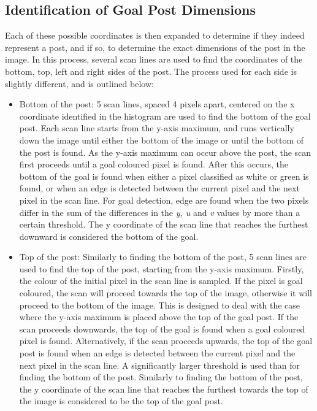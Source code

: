 \documentclass[pdftex,11pt,a4paper]{report}
\begin{document}
\subsection{Identification of Goal Post Dimensions}

Each of these possible coordinates is then expanded to determine if they indeed represent a post, and if so, to determine the exact dimensions of the post in the image. In this process, several scan lines are used to find the coordinates of the bottom, top, left and right sides of the post. The process used for each side is slightly different, and is outlined below:\begin{itemize}
\item{Bottom of the post: 5 scan lines, spaced 4 pixels apart, centered on the x coordinate identified in the histogram are used to find the bottom of the goal post. Each scan line starts from the y-axis maximum, and runs vertically down the image until either the bottom of the image or until the bottom of the post is found. As the y-axis maximum can occur above the post, the scan first proceeds until a goal coloured pixel is found. After this occurs, the bottom of the goal is found when either a pixel classified as white or green is found, or when an edge is detected between the current pixel and the next pixel in the scan line. For goal detection, edge are found when the two pixels differ in the sum of the differences in the \emph{y, u} and \emph{v} values by more than a certain threshold. The y coordinate of the scan line that reaches the furthest downward is considered the bottom of the goal.}
\item{Top of the post: Similarly to finding the bottom of the post, 5 scan lines are used to find the top of the post, starting from the y-axis maximum. Firstly, the colour of the initial pixel in the scan line is sampled. If the pixel is goal coloured, the scan will proceed towards the top of the image, otherwise it will proceed to the bottom of the image. This is designed to deal with the case where the y-axis maximum is placed above the top of the goal post. If the scan proceeds downwards, the top of the goal is found when a goal coloured pixel is found. Alternatively, if the scan proceeds upwards, the top of the goal post is found when an edge is detected between the current pixel and the next pixel in the scan line. A significantly larger threshold is used than for finding the bottom of the post. Similarly to finding the bottom of the post, the y coordinate of the scan line that reaches the furthest towards the top of the image is considered to be the top of the goal post.}

\end{itemize}
\end{document}
